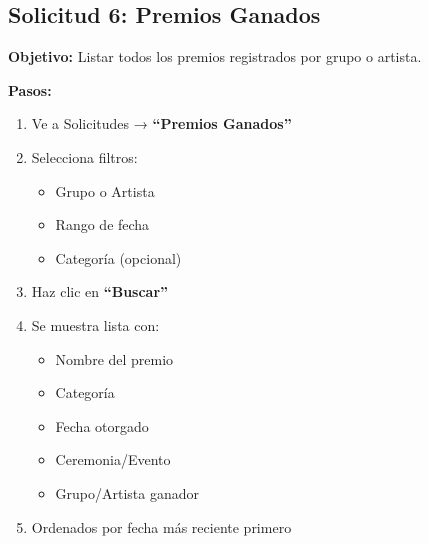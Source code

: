 \documentclass[12pt,a4paper,spanish,oneside]{report}
\begin{document}
\subsection{Solicitud 6: Premios Ganados}

\textbf{Objetivo:} Listar todos los premios registrados por grupo o artista.

\textbf{Pasos:}
\begin{enumerate}
\item Ve a Solicitudes → \textbf{``Premios Ganados''}
\item Selecciona filtros:
\begin{itemize}
\item Grupo o Artista
\item Rango de fecha
\item Categoría (opcional)
\end{itemize}
\item Haz clic en \textbf{``Buscar''}
\item Se muestra lista con:
\begin{itemize}
\item Nombre del premio
\item Categoría
\item Fecha otorgado
\item Ceremonia/Evento
\item Grupo/Artista ganador
\end{itemize}
\item Ordenados por fecha más reciente primero
\end{enumerate}
\end{document}
